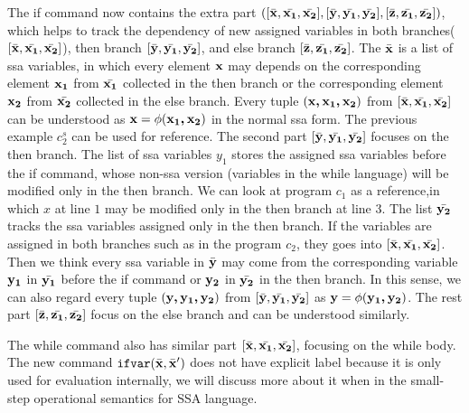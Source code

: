 \documentclass[a4paper,11pt]{article}
\begin{document}
{
The if command now contains the extra part 
$([\bar{{\boldsymbol{\mathbf{x}}}}, \bar{{\boldsymbol{\mathbf{x_1}}}}, \bar{{\boldsymbol{\mathbf{x_2}}}}] , 
[\bar{{\boldsymbol{\mathbf{y}}}}, \bar{{\boldsymbol{\mathbf{y_1}}}}, \bar{{\boldsymbol{\mathbf{y_2}}}}],
[\bar{{\boldsymbol{\mathbf{z}}}}, \bar{{\boldsymbol{\mathbf{z_1}}}}, \bar{{\boldsymbol{\mathbf{z_2}}}}] )$, 
which helps to track the dependency of new assigned variables in both branches($[\bar{{\boldsymbol{\mathbf{x}}}}, \bar{{\boldsymbol{\mathbf{x_1}}}}, \bar{{\boldsymbol{\mathbf{x_2}}}}]$), 
then branch $[\bar{{\boldsymbol{\mathbf{y}}}}, \bar{{\boldsymbol{\mathbf{y_1}}}}, \bar{{\boldsymbol{\mathbf{y_2}}}}]$, 
and else branch $[\bar{{\boldsymbol{\mathbf{z}}}}, \bar{{\boldsymbol{\mathbf{z_1}}}}, \bar{{\boldsymbol{\mathbf{z_2}}}}] $. 
The $\bar{{\boldsymbol{\mathbf{x}}}}$ is a list of ssa variables, in which every element ${\boldsymbol{\mathbf{x}}}$ may depends on the corresponding element ${\boldsymbol{\mathbf{x_1}}}$ from $\bar{{\boldsymbol{\mathbf{x_1}}}}$ collected in the then branch or the corresponding element ${\boldsymbol{\mathbf{x_2}}}$ from $\bar{{\boldsymbol{\mathbf{x_2}}}}$ collected in the else branch. 
%
Every tuple $({\boldsymbol{\mathbf{x,x_1,x_2 }}})$ from $[\bar{{\boldsymbol{\mathbf{x}}}}, \bar{{\boldsymbol{\mathbf{x_1}}}}, \bar{{\boldsymbol{\mathbf{x_2}}}}]$ can be understood as ${\boldsymbol{\mathbf{x}}} = \phi({\boldsymbol{\mathbf{x_1,x_2}}})$ in the normal ssa form. 
The previous example $c_2^{s}$ can be used for reference. 
The second part $[\bar{{\boldsymbol{\mathbf{y}}}}, \bar{{\boldsymbol{\mathbf{y_1}}}}, \bar{{\boldsymbol{\mathbf{y_2}}}}]$ focuses on the then branch. 
The list of ssa variables $y_1$ stores the assigned ssa variables before the if command, whose non-ssa version (variables in the while language) will be modified only in the then branch. 
We can look at program $c_1$ as a reference,in which $x$ at line $1$ may be modified only in the then branch at line $3$. 
The list $\bar{{\boldsymbol{\mathbf{y_2}}}}$ tracks the ssa variables assigned only in the then branch. 
If the variables are assigned in both branches such as in the program $c_2$, they goes into $[\bar{{\boldsymbol{\mathbf{x}}}}, \bar{{\boldsymbol{\mathbf{x_1}}}}, \bar{{\boldsymbol{\mathbf{x_2}}}}]$. Then we think every ssa variable in $\bar{{\boldsymbol{\mathbf{y}}}}$ may come from the corresponding variable ${\boldsymbol{\mathbf{y_1}}}$ in $\bar{{\boldsymbol{\mathbf{y_1}}}}$ before the if command or ${\boldsymbol{\mathbf{y_2}}}$ in $\bar{{\boldsymbol{\mathbf{y_2}}}}$ in the then branch. 
In this sense, we can also regard every tuple $({\boldsymbol{\mathbf{y,y_1,y_2 }}})$ from $[\bar{{\boldsymbol{\mathbf{y}}}}, \bar{{\boldsymbol{\mathbf{y_1}}}}, \bar{{\boldsymbol{\mathbf{y_2}}}}]$ as ${\boldsymbol{\mathbf{y}}} = \phi({\boldsymbol{\mathbf{y_1,y_2}}})$. 
The rest part $[\bar{{\boldsymbol{\mathbf{z}}}}, \bar{{\boldsymbol{\mathbf{z_1}}}}, \bar{{\boldsymbol{\mathbf{z_2}}}}]$ focus on the else branch and can be understood similarly. 
}

The while command also has similar part $ [\bar{{\boldsymbol{\mathbf{x}}}}, \bar{{\boldsymbol{\mathbf{x_1}}}}, \bar{{\boldsymbol{\mathbf{x_2}}}}]$, focusing on the while body. 
The new command ${{\mathtt{ifvar}(\bar{{\boldsymbol{\mathbf{x}}}}, \bar{{\boldsymbol{\mathbf{x}}}}')}}$ does not have explicit label because it is only used for evaluation internally, we will discuss more about it when in the 
small-step operational semantics for SSA language. 
\end{document}
